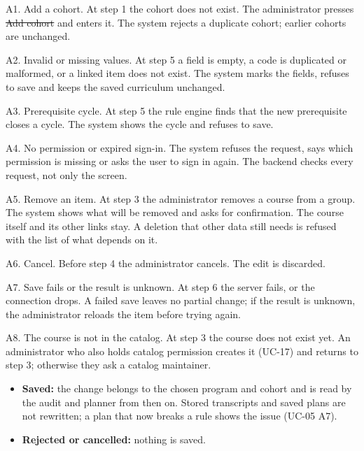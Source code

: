 \begin{altflows}
  \item[A1. Add a cohort.] At step 1 the cohort does not exist. The administrator presses \st{Add cohort} and enters it.
        The system rejects a duplicate cohort; earlier cohorts are unchanged.
  \item[A2. Invalid or missing values.] At step 5 a field is empty, a code is duplicated or malformed, or a linked item does
        not exist. The system marks the fields, refuses to save and keeps the saved curriculum unchanged.
  \item[A3. Prerequisite cycle.] At step 5 the rule engine finds that the new prerequisite closes a cycle. The system shows
        the cycle and refuses to save.
  \item[A4. No permission or expired sign-in.] The system refuses the request, says which permission is missing or asks
        the user to sign in again. The backend checks every request, not only the screen.
  \item[A5. Remove an item.] At step 3 the administrator removes a course from a group. The system shows what will be
        removed and asks for confirmation. The course itself and its other links stay. A deletion that other data still
        needs is refused with the list of what depends on it.
  \item[A6. Cancel.] Before step 4 the administrator cancels. The edit is discarded.
  \item[A7. Save fails or the result is unknown.] At step 6 the server fails, or the connection drops. A failed save leaves
        no partial change; if the result is unknown, the administrator reloads the item before trying again.
  \item[A8. The course is not in the catalog.] At step 3 the course does not exist yet. An administrator who also holds
        catalog permission creates it (UC-17) and returns to step 3; otherwise they ask a catalog maintainer.
\end{altflows}

\begin{itemize}
  \item \textbf{Saved:} the change belongs to the chosen program and cohort and is read by the audit and planner from then
        on. Stored transcripts and saved plans are not rewritten; a plan that now breaks a rule shows the issue (UC-05 A7).
  \item \textbf{Rejected or cancelled:} nothing is saved.
\end{itemize}

